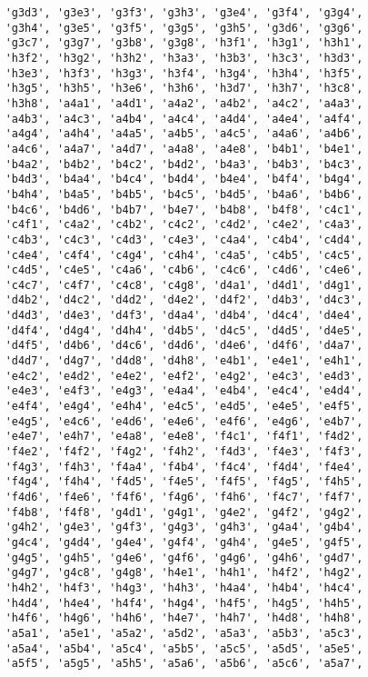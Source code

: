 \begin{verbatim}
    'g3d3', 'g3e3', 'g3f3', 'g3h3', 'g3e4', 'g3f4', 'g3g4',
    'g3h4', 'g3e5', 'g3f5', 'g3g5', 'g3h5', 'g3d6', 'g3g6',
    'g3c7', 'g3g7', 'g3b8', 'g3g8', 'h3f1', 'h3g1', 'h3h1',
    'h3f2', 'h3g2', 'h3h2', 'h3a3', 'h3b3', 'h3c3', 'h3d3',
    'h3e3', 'h3f3', 'h3g3', 'h3f4', 'h3g4', 'h3h4', 'h3f5',
    'h3g5', 'h3h5', 'h3e6', 'h3h6', 'h3d7', 'h3h7', 'h3c8',
    'h3h8', 'a4a1', 'a4d1', 'a4a2', 'a4b2', 'a4c2', 'a4a3',
    'a4b3', 'a4c3', 'a4b4', 'a4c4', 'a4d4', 'a4e4', 'a4f4',
    'a4g4', 'a4h4', 'a4a5', 'a4b5', 'a4c5', 'a4a6', 'a4b6',
    'a4c6', 'a4a7', 'a4d7', 'a4a8', 'a4e8', 'b4b1', 'b4e1',
    'b4a2', 'b4b2', 'b4c2', 'b4d2', 'b4a3', 'b4b3', 'b4c3',
    'b4d3', 'b4a4', 'b4c4', 'b4d4', 'b4e4', 'b4f4', 'b4g4',
    'b4h4', 'b4a5', 'b4b5', 'b4c5', 'b4d5', 'b4a6', 'b4b6',
    'b4c6', 'b4d6', 'b4b7', 'b4e7', 'b4b8', 'b4f8', 'c4c1',
    'c4f1', 'c4a2', 'c4b2', 'c4c2', 'c4d2', 'c4e2', 'c4a3',
    'c4b3', 'c4c3', 'c4d3', 'c4e3', 'c4a4', 'c4b4', 'c4d4',
    'c4e4', 'c4f4', 'c4g4', 'c4h4', 'c4a5', 'c4b5', 'c4c5',
    'c4d5', 'c4e5', 'c4a6', 'c4b6', 'c4c6', 'c4d6', 'c4e6',
    'c4c7', 'c4f7', 'c4c8', 'c4g8', 'd4a1', 'd4d1', 'd4g1',
    'd4b2', 'd4c2', 'd4d2', 'd4e2', 'd4f2', 'd4b3', 'd4c3',
    'd4d3', 'd4e3', 'd4f3', 'd4a4', 'd4b4', 'd4c4', 'd4e4',
    'd4f4', 'd4g4', 'd4h4', 'd4b5', 'd4c5', 'd4d5', 'd4e5',
    'd4f5', 'd4b6', 'd4c6', 'd4d6', 'd4e6', 'd4f6', 'd4a7',
    'd4d7', 'd4g7', 'd4d8', 'd4h8', 'e4b1', 'e4e1', 'e4h1',
    'e4c2', 'e4d2', 'e4e2', 'e4f2', 'e4g2', 'e4c3', 'e4d3',
    'e4e3', 'e4f3', 'e4g3', 'e4a4', 'e4b4', 'e4c4', 'e4d4',
    'e4f4', 'e4g4', 'e4h4', 'e4c5', 'e4d5', 'e4e5', 'e4f5',
    'e4g5', 'e4c6', 'e4d6', 'e4e6', 'e4f6', 'e4g6', 'e4b7',
    'e4e7', 'e4h7', 'e4a8', 'e4e8', 'f4c1', 'f4f1', 'f4d2',
    'f4e2', 'f4f2', 'f4g2', 'f4h2', 'f4d3', 'f4e3', 'f4f3',
    'f4g3', 'f4h3', 'f4a4', 'f4b4', 'f4c4', 'f4d4', 'f4e4',
    'f4g4', 'f4h4', 'f4d5', 'f4e5', 'f4f5', 'f4g5', 'f4h5',
    'f4d6', 'f4e6', 'f4f6', 'f4g6', 'f4h6', 'f4c7', 'f4f7',
    'f4b8', 'f4f8', 'g4d1', 'g4g1', 'g4e2', 'g4f2', 'g4g2',
    'g4h2', 'g4e3', 'g4f3', 'g4g3', 'g4h3', 'g4a4', 'g4b4',
    'g4c4', 'g4d4', 'g4e4', 'g4f4', 'g4h4', 'g4e5', 'g4f5',
    'g4g5', 'g4h5', 'g4e6', 'g4f6', 'g4g6', 'g4h6', 'g4d7',
    'g4g7', 'g4c8', 'g4g8', 'h4e1', 'h4h1', 'h4f2', 'h4g2',
    'h4h2', 'h4f3', 'h4g3', 'h4h3', 'h4a4', 'h4b4', 'h4c4',
    'h4d4', 'h4e4', 'h4f4', 'h4g4', 'h4f5', 'h4g5', 'h4h5',
    'h4f6', 'h4g6', 'h4h6', 'h4e7', 'h4h7', 'h4d8', 'h4h8',
    'a5a1', 'a5e1', 'a5a2', 'a5d2', 'a5a3', 'a5b3', 'a5c3',
    'a5a4', 'a5b4', 'a5c4', 'a5b5', 'a5c5', 'a5d5', 'a5e5',
    'a5f5', 'a5g5', 'a5h5', 'a5a6', 'a5b6', 'a5c6', 'a5a7',

\end{verbatim}
